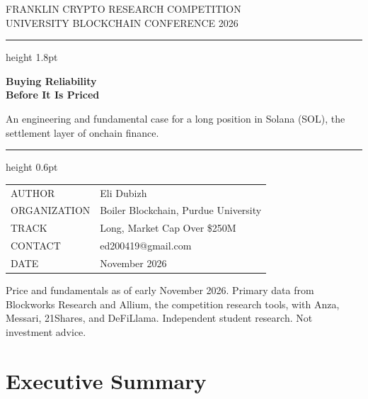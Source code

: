 \documentclass[11pt]{article}
\begin{document}
\thispagestyle{empty}
\vspace*{0.8in}

{\footnotesize\sffamily\color{soft}\MakeUppercase{Franklin Crypto Research Competition}\\[2pt]
\MakeUppercase{University Blockchain Conference 2026}}

\vspace{10pt}
{\color{solpurple}\hrule height 1.8pt}
\vspace{34pt}

{\sffamily\bfseries\fontsize{30}{34}\selectfont Buying Reliability\\ Before It Is Priced\par}

\vspace{18pt}
{\large\color{mid} An engineering and fundamental case for a long position in Solana (SOL), the settlement layer of onchain finance.\par}

\vfill

{\color{rulegray}\hrule height 0.6pt}
\vspace{16pt}

\noindent\begin{tabular}{@{}p{1.6in}l@{}}
{\sffamily\color{soft}\footnotesize AUTHOR} & Eli Dubizh \\[5pt]
{\sffamily\color{soft}\footnotesize ORGANIZATION} & Boiler Blockchain, Purdue University \\[5pt]
{\sffamily\color{soft}\footnotesize TRACK} & Long, Market Cap Over \$250M \\[5pt]
{\sffamily\color{soft}\footnotesize CONTACT} & ed200419@gmail.com \\[5pt]
{\sffamily\color{soft}\footnotesize DATE} & November 2026 \\
\end{tabular}

\vspace{20pt}
{\footnotesize\color{soft} Price and fundamentals as of early November 2026. Primary data from Blockworks Research and Allium, the competition research tools, with Anza, Messari, 21Shares, and DeFiLlama. Independent student research. Not investment advice.}

\clearpage
\setcounter{page}{1}

\section{Executive Summary}
\end{document}
